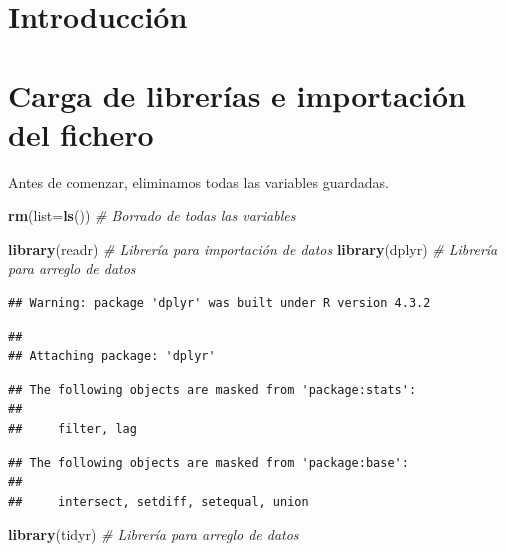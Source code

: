 \documentclass[data,article,submit,moreauthors,pdftex]{Definitions/mdpi}
\newenvironment{Shaded}{\begin{snugshade}}{\end{snugshade}}
\newcommand{\AttributeTok}[1]{\textcolor[rgb]{0.13,0.29,0.53}{#1}}
\newcommand{\CommentTok}[1]{\textcolor[rgb]{0.56,0.35,0.01}{\textit{#1}}}
\newcommand{\FunctionTok}[1]{\textcolor[rgb]{0.13,0.29,0.53}{\textbf{#1}}}
\newcommand{\NormalTok}[1]{#1}
\begin{document}

\hypertarget{introducciuxf3n}{%
\section{Introducción}\label{introducciuxf3n}}

\hypertarget{carga-de-libreruxedas-e-importaciuxf3n-del-fichero}{%
\section{Carga de librerías e importación del
fichero}\label{carga-de-libreruxedas-e-importaciuxf3n-del-fichero}}

Antes de comenzar, eliminamos todas las variables guardadas.

\begin{Shaded}
\begin{Highlighting}[]
\FunctionTok{rm}\NormalTok{(}\AttributeTok{list=}\FunctionTok{ls}\NormalTok{())  }\CommentTok{\# Borrado de todas las variables}
\end{Highlighting}
\end{Shaded}

\begin{Shaded}
\begin{Highlighting}[]
\FunctionTok{library}\NormalTok{(readr)  }\CommentTok{\# Librería para importación de datos}
\FunctionTok{library}\NormalTok{(dplyr) }\CommentTok{\# Librería para arreglo de datos}
\end{Highlighting}
\end{Shaded}

\begin{verbatim}
## Warning: package 'dplyr' was built under R version 4.3.2
\end{verbatim}

\begin{verbatim}
## 
## Attaching package: 'dplyr'
\end{verbatim}

\begin{verbatim}
## The following objects are masked from 'package:stats':
## 
##     filter, lag
\end{verbatim}

\begin{verbatim}
## The following objects are masked from 'package:base':
## 
##     intersect, setdiff, setequal, union
\end{verbatim}

\begin{Shaded}
\begin{Highlighting}[]
\FunctionTok{library}\NormalTok{(tidyr) }\CommentTok{\# Librería para arreglo de datos}
\end{Highlighting}
\end{Shaded}
\end{document}
